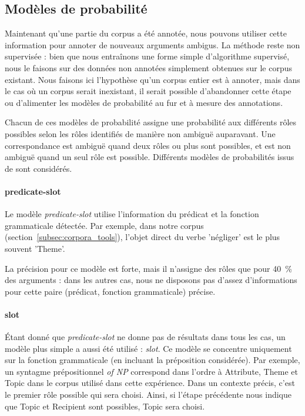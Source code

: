 
\subsection{Modèles de probabilité}
\label{subsec:probability}

Maintenant qu'une partie du corpus a été annotée, nous pouvons utiliser cette
information pour annoter de nouveaux arguments ambigus. La méthode reste non
supervisée : bien que nous entraînons une forme simple d'algorithme supervisé,
nous le faisons sur des données non annotées simplement obtenues sur le corpus
existant. Nous faisons ici l'hypothèse qu'un corpus entier est à annoter, mais
dans le cas où un corpus serait inexistant, il serait possible d'abandonner
cette étape ou d'alimenter les modèles de probabilité au fur et à mesure des
annotations.

Chacun de ces modèles de probabilité assigne une probabilité aux différents
rôles possibles selon les rôles identifiés de manière non ambiguë auparavant.
Une correspondance est ambiguë quand deux rôles ou plus sont possibles, et est
non ambiguë quand un seul rôle est possible. Différents modèles de probabilités
issus de \citep{swier2005exploiting} sont considérés.


\paragraph{predicate-slot}

Le modèle \emph{predicate-slot} utilise l'information du prédicat et la
fonction grammaticale détectée. Par exemple, dans notre corpus
(section~\ref{subsec:corpora_tools}), l'objet direct du verbe 'négliger' est le
plus souvent 'Theme'.

La précision pour ce modèle est forte, mais il n'assigne des rôles que pour
40~\% des arguments : dans les autres cas, nous ne disposons pas d'assez
d'informations pour cette paire (prédicat, fonction grammaticale) précise.

\paragraph{slot}

Étant donné que \emph{predicate-slot} ne donne pas de résultats dans tous les
cas, un modèle plus simple a aussi été utilisé : \emph{slot}. Ce modèle se
concentre uniquement sur la fonction grammaticale (en incluant la préposition
considérée). Par exemple, un syntagme prépositionnel \emph{of NP} correspond
dans l'ordre à Attribute, Theme et Topic dans le corpus utilisé dans cette
expérience. Dans un contexte précis, c'est le premier rôle possible qui sera
choisi. Ainsi, si l'étape précédente nous indique que Topic et Recipient sont
possibles, Topic sera choisi.

